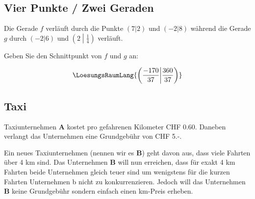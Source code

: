 \subsection{Vier Punkte / Zwei Geraden}
Die Gerade $f$ verläuft durch die Punkte $(7|2)$ und $(-2|8)$ während
die Gerade $g$ durch $(-2|6)$ und $\left(2\middle|\frac14\right)$
verläuft.

Geben Sie den Schnittpunkt von $f$ und $g$ an:

\vspace{15mm}

$$\LoesungsRaumLang{\left( \frac{-170}{37} \middle| \frac{360}{37} \right)}$$

\subsection{Taxi}
Taxiunternehmen \textbf{A} kostet pro gefahrenen Kilometer CHF
0.60. Daneben verlangt das Unternehmen eine Grundgebühr von CHF 5.-.

Ein neues Taxiunternehmen (nennen wir es \textbf{B}) geht davon aus, dass viele Fahrten über 4 km
sind. Das Unternehmen \textbf{B} will nun erreichen, dass für exakt 4
km Fahrten beide Unternehmen gleich teuer sind um wenigstens für die
kurzen Fahrten Unternehmen b nicht zu konkurrenzieren. Jedoch will das
Unternehmen \textbf{B} keine Grundgebühr sondern einfach einen
km-Preis erheben.

